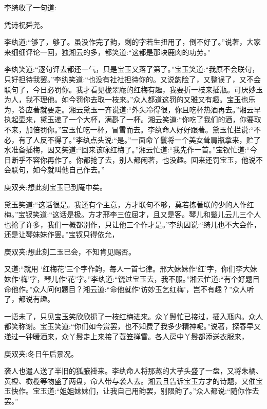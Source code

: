 \begin{parag}
    李绮收了一句道:
\end{parag}


\begin{poem}
    \begin{pl} 凭诗祝舜尧。\end{pl}
\end{poem}


\begin{parag}
    李纨道:“够了，够了。虽没作完了韵，剩的字若生扭用了，倒不好了。”说著，大家来细细评论一回，独湘云的多，都笑道:“这都是那块鹿肉的功劳。”
\end{parag}


\begin{parag}
    李纨笑道:“逐句评去都还一气，只是宝玉又落了第了。”宝玉笑道:“我原不会联句，只好担待我罢。”李纨笑道:“也没有社社担待你的。又说韵险了，又整误了，又不会联句了，今日必罚你。我才看见栊翠庵的红梅有趣，我要折一枝来插瓶。可厌妙玉为人，我不理他。如今罚你去取一枝来。”众人都道这罚的又雅又有趣。宝玉也乐为，答应著就要走。湘云黛玉一齐说道:“外头冷得很，你且吃杯热酒再去。”湘云早执起壶来，黛玉递了一个大杯，满斟了一杯。湘云笑道:“你吃了我们的酒，你要取不来，加倍罚你。”宝玉忙吃一杯，冒雪而去。李纨命人好好跟著。黛玉忙拦说:“不必，有了人反不得了。”李纨点头说:“是。”一面命丫鬟将一个美女耸肩瓶拿来，贮了水准备插梅，因又笑道:“回来该咏红梅了。”湘云忙道:“我先作一首。”宝钗忙道:“今日断乎不容你再作了。你都抢了去，别人都闲著，也没趣。回来还罚宝玉，他说不会联句，如今就叫他自己作去。”\begin{note}庚双夹:想此刻宝玉已到庵中矣。\end{note}黛玉笑道:“这话很是。我还有个主意，方才联句不够，莫若拣著联的少的人作红梅。”宝钗笑道:“这话是极。方才邢李三位屈才，且又是客。琴儿和颦儿云儿三个人也抢了许多，我们一概都别作，只让他三个作才是。”李纨因说:“绮儿也不大会作，还是让琴妹妹作罢。”宝钗只得依允，\begin{note}庚双夹:想此刻二玉已会，不知肯见赐否。\end{note}又道:“就用 ‘红梅花’三个字作韵，每人一首七律。邢大妹妹作‘红’字，你们李大妹妹作‘梅’字，琴儿作‘花’字。”李纨道:“饶过宝玉去，我不服。”湘云忙道:“有个好题目命他作。”众人问何题目？湘云道:“命他就作‘访妙玉乞红梅’，岂不有趣？”众人听了，都说有趣。
\end{parag}


\begin{parag}
    一语未了，只见宝玉笑欣欣掮了一枝红梅进来。众丫鬟忙已接过，插入瓶内。众人都笑称谢。宝玉笑道:“你们如今赏罢，也不知费了我多少精神呢。”说著，探春早又递过一钟暖酒来，众丫鬟走上来接了蓑笠掸雪。各人房中丫鬟都添送衣服来，\begin{note}庚双夹:冬日午后景况。\end{note}袭人也遣人送了半旧的狐腋褂来。李纨命人将那蒸的大芋头盛了一盘，又将朱橘、黄橙、橄榄等物盛了两盘，命人带与袭人去。湘云且告诉宝玉方才的诗题，又催宝玉快作。宝玉道:“姐姐妹妹们，让我自己用韵罢，别限韵了。”众人都说:“随你作去罢。”
\end{parag}


